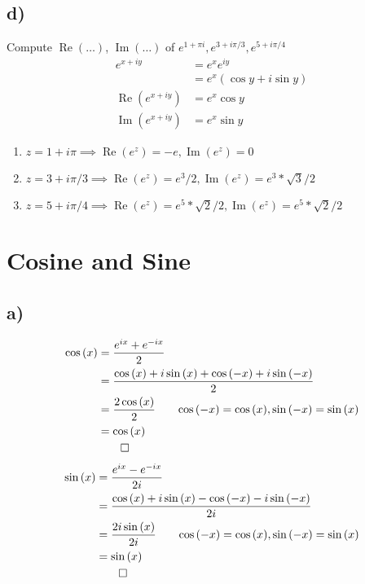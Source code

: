 \documentclass[12pt]{article}
\begin{document}
\subsection{d)}
Compute $\operatorname{Re}{(\ldots)}$, $\operatorname*{Im}{(\ldots)}$ of $e^{1+\pi i}, e^{3+i\pi/3}, e^{5+i\pi/4}$
\begin{align*}
	e^{x+iy} &= e^x e^{iy}\\
	&= e^x \left( \cos{y} + i\sin{y}\right)\\
	\operatorname{Re}{(e^{x+iy})} &= e^x \cos{y}\\
	\operatorname{Im}{(e^{x+iy})} &= e^x \sin{y}
\end{align*}
\begin{enumerate}
	\item $z = 1+i\pi \implies \operatorname{Re}{(e^z)} = -e, \operatorname{Im}{(e^z)} = 0$
	\item $z = 3+i\pi/3 \implies \operatorname{Re}{(e^z)} = e^3/2, \operatorname{Im}{(e^z)} = e^3  * \sqrt{3}/2$
	\item $z = 5+i\pi/4 \implies \operatorname{Re}{(e^z)} = e^5 * \sqrt{2}/2, \operatorname{Im}{(e^z)} = e^5 * \sqrt{2}/2$
\end{enumerate}
\newpage
\section{Cosine and Sine}
\subsection{a)}
\begin{align*}
	\cos{(x)} &= \frac{e^{ix}+e^{-ix}}{2}\\
	&= \frac{\cos{(x)} + i\sin{(x)} + \cos{(-x)} + i\sin{(-x)} }{2}\\
	&= \frac{2\cos{(x)}}{2} \tag*{$\cos{(-x)} = \cos{(x)}, \sin{(-x)} = \sin{(x)}$}\\
	&= \cos{(x)}\\
	&\qed
\end{align*}
\begin{align*}
	\sin{(x)} &= \frac{e^{ix}-e^{-ix}}{2i}\\
	&= \frac{\cos{(x)} + i\sin{(x)} - \cos{(-x)} - i\sin{(-x)} }{2i}\\
	&= \frac{2i\sin{(x)}}{2i} \tag*{$\cos{(-x)} = \cos{(x)}, \sin{(-x)} = \sin{(x)}$}\\
	&= \sin{(x)}\\
	&\qed
\end{align*}
\end{document}
